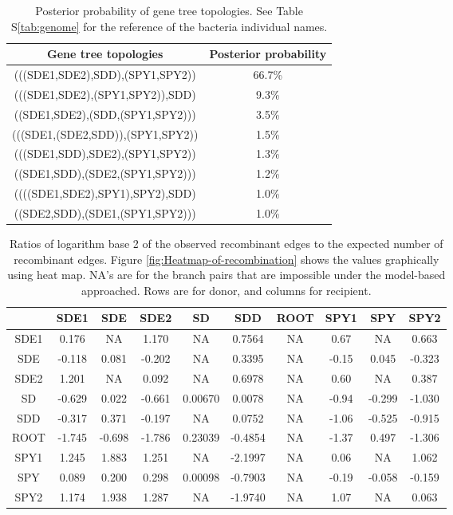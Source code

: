 \documentclass[10pt]{article}
\providecommand{\tabularnewline}{\\}
\begin{document}
\begin{table}
\caption{\label{tab:Gene-tree-topologies}Posterior probability of gene tree
topologies. See Table S\ref{tab:genome} for the reference of the bacteria
individual names.}
\noindent \begin{centering}
\begin{tabular}{cc}
\hline 
Gene tree topologies & Posterior probability\tabularnewline
\hline
(((SDE1,SDE2),SDD),(SPY1,SPY2)) & 66.7\%\tabularnewline
(((SDE1,SDE2),(SPY1,SPY2)),SDD) & 9.3\%\tabularnewline
((SDE1,SDE2),(SDD,(SPY1,SPY2))) & 3.5\%\tabularnewline
(((SDE1,(SDE2,SDD)),(SPY1,SPY2)) & 1.5\%\tabularnewline
(((SDE1,SDD),SDE2),(SPY1,SPY2)) & 1.3\%\tabularnewline
((SDE1,SDD),(SDE2,(SPY1,SPY2))) & 1.2\%\tabularnewline
((((SDE1,SDE2),SPY1),SPY2),SDD) & 1.0\%\tabularnewline
((SDE2,SDD),(SDE1,(SPY1,SPY2))) & 1.0\%\tabularnewline
\hline
\end{tabular}
\par\end{centering}
\end{table}
\clearpage{}

\begin{table}
\caption{\label{tab:heatmap}Ratios of logarithm base 2 of the observed
recombinant edges to the expected number of recombinant edges.  Figure
\ref{fig:Heatmap-of-recombination} shows the values graphically using heat map.
NA's are for the branch pairs that are impossible under the model-based
approached. Rows are for donor, and columns for recipient.}
\noindent \centering{}\begin{tabular}{cccccccccc}
\hline
& SDE1 & SDE & SDE2 & SD & SDD & ROOT & SPY1 & SPY & SPY2 \tabularnewline
\hline
SDE1& 0.176  &   NA  &1.170  &    NA & 0.7564  & NA & 0.67 &    NA & 0.663\tabularnewline
SDE & -0.118 & 0.081 &-0.202 &     NA&  0.3395 &  NA& -0.15&  0.045& -0.323\tabularnewline
SDE2& 1.201  &   NA  &0.092  &    NA & 0.6978  & NA & 0.60 &    NA & 0.387\tabularnewline
SD  & -0.629 & 0.022 &-0.661 &0.00670&  0.0078 &  NA& -0.94& -0.299& -1.030\tabularnewline
SDD & -0.317 & 0.371 &-0.197 &     NA&  0.0752 &  NA& -1.06& -0.525& -0.915\tabularnewline
ROOT& -1.745 &-0.698 &-1.786 &0.23039& -0.4854 &  NA& -1.37&  0.497& -1.306\tabularnewline
SPY1& 1.245  &1.883  &1.251  &    NA &-2.1997  & NA & 0.06 &    NA & 1.062\tabularnewline
SPY & 0.089  &0.200  &0.298 &0.00098 &-0.7903  & NA &-0.19 &-0.058 &-0.159\tabularnewline
SPY2& 1.174  &1.938  &1.287  &    NA &-1.9740  & NA & 1.07 &    NA & 0.063\tabularnewline
\hline
\end{tabular}
\end{table}
\end{document}
